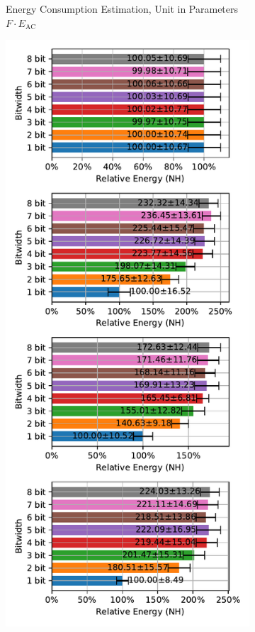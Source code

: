 \begin{figure}[!htpb]
\begin{subfigure}[H]{0.48\textwidth}
                \caption{Energy Consumption Estimation, Unit in Parameters $F\cdot E_{\text{AC}}$}
            \end{subfigure}
            \hfill
            \begin{subfigure}[H]{0.48\textwidth}
                \includegraphics[width=\textwidth]{../standard/FashionMNIST/plots/fashionmnist_test_relative_energy_nh.pdf}

\end{subfigure}
\end{figure}

